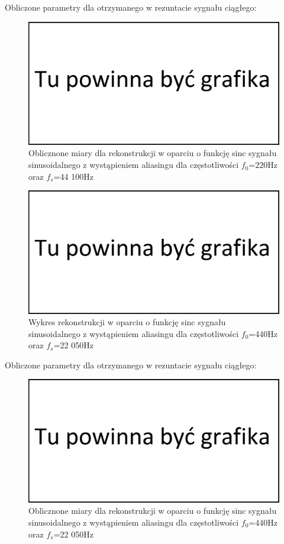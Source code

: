 \documentclass[12pt]{article}
\begin{document}
Obliczone parametry dla otrzymanego w rezuntacie sygnału ciągłego:
\begin{figure}[H]
	\centering
	\includegraphics[width=\linewidth]{tmp.jpg}
	\caption{Oblicznone miary dla rekonstrukcji w oparciu o funkcję sinc sygnału sinusoidalnego z wystąpieniem aliasingu dla częstotliwości $f_0$=220Hz oraz $f_s$=44 100Hz} 
	\label{wartości dla eksperymentu 6.2}
\end{figure}
\begin{figure}[H]
	\centering
	\includegraphics[width=\linewidth]{tmp.jpg}
	\caption{Wykres rekonstrukcji w oparciu o funkcję sinc sygnału sinusoidalnego z wystąpieniem aliasingu dla częstotliwości $f_0$=440Hz oraz $f_s$=22 050Hz}
	\label{wykres dla eksperymentu 6.3}
\end{figure}
Obliczone parametry dla otrzymanego w rezuntacie sygnału ciągłego:
\begin{figure}[H]
	\centering
	\includegraphics[width=\linewidth]{tmp.jpg}
	\caption{Oblicznone miary dla rekonstrukcji w oparciu o funkcję sinc sygnału sinusoidalnego z wystąpieniem aliasingu dla częstotliwości $f_0$=440Hz oraz $f_s$=22 050Hz}
	\label{wartości dla eksperymentu 6.3}
\end{figure}
\end{document}

